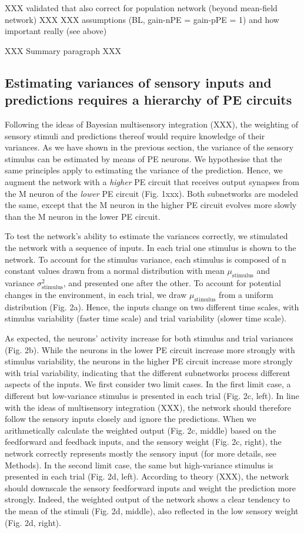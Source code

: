 \documentclass[10pt,a4paper,draft]{article}
\begin{document}
XXX validated that also correct for population network (beyond mean-field network) XXX
XXX assumptions (BL, gain-nPE = gain-pPE = 1) and how important really (see above)

XXX Summary paragraph XXX


\subsection*{Estimating variances of sensory inputs and predictions requires a hierarchy of PE circuits}
%
Following the ideas of Bayesian multisensory integration (XXX), the weighting of sensory stimuli and predictions thereof would require knowledge of their variances. As we have shown in the previous section, the variance of the sensory stimulus can be estimated by means of PE neurons. We hypothesise that the same principles apply to estimating the variance of the prediction. Hence, we augment the network with a \textit{higher} PE circuit that receives output synapses from the M neuron of the \textit{lower} PE circuit (Fig. 1xxx). Both subnetworks are modeled the same, except that the M neuron in the higher PE circuit evolves more slowly than the M neuron in the lower PE circuit. 

To test the network's ability to estimate the variances correctly, we stimulated the network with a sequence of inputs. In each trial one stimulus is shown to the network. To account for the stimulus variance, each stimulus is composed of n constant values drawn from a normal distribution with mean $\mu_\mathrm{stimulus}$ and variance $\sigma_\mathrm{stimulus}^2$, and presented one after the other. To account for potential changes in the environment, in each trial, we draw $\mu_\mathrm{stimulus}$ from a uniform distribution (Fig. 2a). Hence, the inputs change on two different time scales, with stimulus variability (faster time scale) and trial variability (slower time scale).

As expected, the neurons' activity increase for both stimulus and trial variances (Fig. 2b). While the neurons in the lower PE circuit increase more strongly with stimulus variability, the neurons in the higher PE circuit increase more strongly with trial variability, indicating that the different subnetworks process different aspects of the inputs. We first consider two limit cases. In the first limit case, a different but low-variance stimulus is presented in each trial (Fig. 2c, left). In line with the ideas of multisensory integration (XXX), the network should therefore follow the sensory inputs closely and ignore the predictions. When we arithmetically calculate the weighted output (Fig. 2c, middle) based on the feedforward and feedback inputs, and the sensory weight (Fig. 2c, right), the network correctly represents mostly the sensory input (for more details, see Methods). In the second limit case, the same but high-variance stimulus is presented in each trial (Fig. 2d, left). According to theory (XXX), the network should downscale the sensory feedforward inputs and weight the prediction more strongly. Indeed, the weighted output of the network shows a clear tendency to the mean of the stimuli (Fig. 2d, middle), also reflected in the low sensory weight (Fig. 2d, right). 
\end{document}
